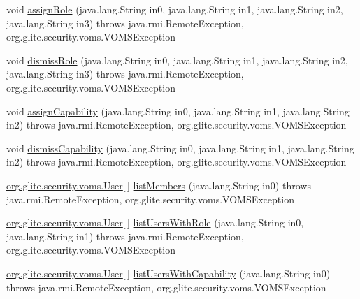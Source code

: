 \begin{DoxyCompactItemize}
\item 
void \hyperlink{classorg_1_1glite_1_1security_1_1voms_1_1service_1_1admin_1_1VOMSAdminSoapBindingSkeleton_abba0061989b8e855fa4c023d305c5a4a}{assignRole} (java.lang.String in0, java.lang.String in1, java.lang.String in2, java.lang.String in3)  throws java.rmi.RemoteException, org.glite.security.voms.VOMSException     
\item 
void \hyperlink{classorg_1_1glite_1_1security_1_1voms_1_1service_1_1admin_1_1VOMSAdminSoapBindingSkeleton_afda370bdbefba08d2a28d21152f3a484}{dismissRole} (java.lang.String in0, java.lang.String in1, java.lang.String in2, java.lang.String in3)  throws java.rmi.RemoteException, org.glite.security.voms.VOMSException     
\item 
void \hyperlink{classorg_1_1glite_1_1security_1_1voms_1_1service_1_1admin_1_1VOMSAdminSoapBindingSkeleton_a6e156564c3af8cc48e8661e8e3d3e5eb}{assignCapability} (java.lang.String in0, java.lang.String in1, java.lang.String in2)  throws java.rmi.RemoteException, org.glite.security.voms.VOMSException     
\item 
void \hyperlink{classorg_1_1glite_1_1security_1_1voms_1_1service_1_1admin_1_1VOMSAdminSoapBindingSkeleton_a41ea5e6075c43a4f077e9d6370af698e}{dismissCapability} (java.lang.String in0, java.lang.String in1, java.lang.String in2)  throws java.rmi.RemoteException, org.glite.security.voms.VOMSException     
\item 
\hyperlink{classorg_1_1glite_1_1security_1_1voms_1_1User}{org.glite.security.voms.User}\mbox{[}$\,$\mbox{]} \hyperlink{classorg_1_1glite_1_1security_1_1voms_1_1service_1_1admin_1_1VOMSAdminSoapBindingSkeleton_aa8de0387b2ccd37fb3711d87e548c092}{listMembers} (java.lang.String in0)  throws java.rmi.RemoteException, org.glite.security.voms.VOMSException     
\item 
\hyperlink{classorg_1_1glite_1_1security_1_1voms_1_1User}{org.glite.security.voms.User}\mbox{[}$\,$\mbox{]} \hyperlink{classorg_1_1glite_1_1security_1_1voms_1_1service_1_1admin_1_1VOMSAdminSoapBindingSkeleton_a770493d8d5a50eb0079be65591feb937}{listUsersWithRole} (java.lang.String in0, java.lang.String in1)  throws java.rmi.RemoteException, org.glite.security.voms.VOMSException     
\item 
\hyperlink{classorg_1_1glite_1_1security_1_1voms_1_1User}{org.glite.security.voms.User}\mbox{[}$\,$\mbox{]} \hyperlink{classorg_1_1glite_1_1security_1_1voms_1_1service_1_1admin_1_1VOMSAdminSoapBindingSkeleton_af9df437c97a3f284a6ebf516424e1c6e}{listUsersWithCapability} (java.lang.String in0)  throws java.rmi.RemoteException, org.glite.security.voms.VOMSException     

\end{DoxyCompactItemize}
